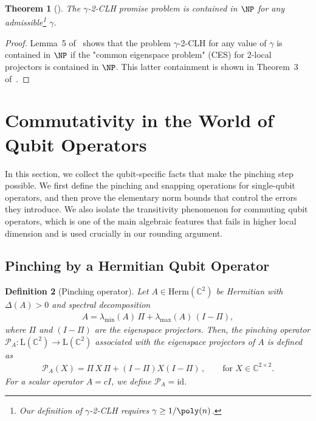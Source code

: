 \documentclass[a4paper,onecolumn,11pt]{quantumarticle}
\theoremstyle{plain}
\newtheorem{theorem}{Theorem}[section]
\newtheorem{definition}[theorem]{Definition}
\begin{document}
\begin{theorem}[\cite{bravyi2004commutativeversionklocalhamiltonian}]
\label{thm:clh-in-np}
    The $\gamma$-2-CLH promise problem is contained in $\NP$ for any admissible\footnote{Our definition of $\gamma$-2-CLH requires $\gamma \geq 1/\poly(n)$.} $\gamma$.
\end{theorem}
\begin{proof}
    Lemma~5 of~\cite{bravyi2004commutativeversionklocalhamiltonian} shows that the problem $\gamma$-2-CLH for any value of $\gamma$ is contained in $\NP$ if the "common eigenspace problem" (CES) for 2-local projectors is contained in $\NP$. This latter containment is shown in Theorem~3 of~\cite{bravyi2004commutativeversionklocalhamiltonian}.
\end{proof}


\section{Commutativity in the World of Qubit Operators}

In this section, we collect the qubit-specific facts that make the
pinching step possible.  We first define the pinching and snapping
operations for single-qubit operators, and then prove the elementary norm
bounds that control the errors they introduce.  We also isolate the
transitivity phenomenon for commuting qubit operators, which is one of the
main algebraic features that fails in higher local dimension and is used
crucially in our rounding argument.

\subsection{Pinching by a Hermitian Qubit Operator}

\begin{definition}[Pinching operator]\label{def:pinching-operator}
Let $A \in \mathrm{Herm}(\mathbb{C}^{2})$ be Hermitian with $\Delta(A)>0$ and spectral decomposition 
\begin{align}
A = \lambda_{\min}(A)\,\Pi + \lambda_{\max}(A)\,(I-\Pi),
\end{align}
where $\Pi$ and $(I-\Pi)$ are the eigenspace projectors. Then, the pinching operator $\mathcal{P}_A: \mathrm{L}(\mathbb{C}^{2})\rightarrow \mathrm{L}(\mathbb{C}^{2})$ associated with the eigenspace projectors of $A$ is defined as
\begin{align}
    \mathcal{P}_A(X) = \Pi \, X \, \Pi + (I-\Pi) X (I-\Pi)\, , \quad\quad \text{for } X \in \mathbb{C}^{2 \times 2}.
    \end{align}
For a scalar operator $A=cI$, we define $\mathcal{P}_A=\mathrm{id}$.
    
\end{definition}
\end{document}
